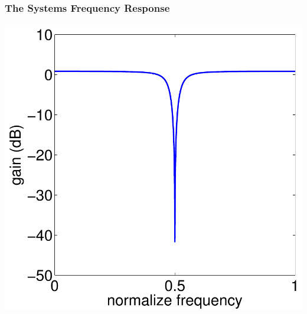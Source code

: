 \documentclass[mathserif,9pt,handout]{beamer}
\begin{document}
\begin{frame}\frametitle{The Systems Frequency Response}\small
  \begin{center}
    \includegraphics[height=.7\textheight]{notch_freq.pdf} 
  \end{center}
\end{frame}
\end{document}
